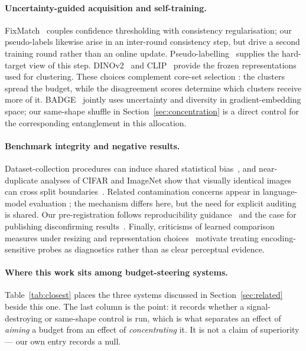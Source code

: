 \documentclass{article}
\begin{document}
\paragraph{Uncertainty-guided acquisition and self-training.}
FixMatch~\citep{sohn2020fixmatch} couples confidence thresholding with consistency regularisation; our pseudo-labels likewise arise in an inter-round consistency step, but drive a second training
round rather than an online update. Pseudo-labelling~\citep{lee2013pseudo} supplies the hard-target
view of this step. DINOv2~\citep{oquab2024dinov2} and CLIP~\citep{radford2021learning} provide the
frozen representations used for clustering. These choices complement core-set selection
\citep{sener2018active}: the clusters spread the budget, while the disagreement scores determine
which clusters receive more of it. BADGE~\citep{ash2020deep} jointly uses uncertainty and diversity
in gradient-embedding space; our same-shape shuffle in Section~\ref{sec:concentration} is a direct
control for the corresponding entanglement in this allocation.

\paragraph{Benchmark integrity and negative results.}
Dataset-collection procedures can induce shared statistical bias~\citep{torralba2011unbiased}, and
near-duplicate analyses of CIFAR and ImageNet show that visually identical images can cross split
boundaries~\citep{barz2020train}. Related contamination concerns appear in language-model evaluation
\citep{wu2024antileak}; the mechanism differs here, but the need for explicit auditing is shared.
Our pre-registration follows reproducibility guidance~\citep{pineau2021improving} and the case for
publishing disconfirming results~\citep{karl2024position}. Finally, criticisms of learned comparison
measures under resizing and representation choices~\citep{parmar2022aliased,jayasumana2024rethinking}
motivate treating encoding-sensitive probes as diagnostics rather than as clear perceptual evidence.

\paragraph{Where this work sits among budget-steering systems.} Table~\ref{tab:closest} places the
three systems discussed in Section~\ref{sec:related} beside this one. The last column is the point: it records whether a signal-destroying or same-shape control is run, which is what separates an
effect of \emph{aiming} a budget from an effect of \emph{concentrating} it. It is not a claim of
superiority --- our own entry records a null.
\end{document}
